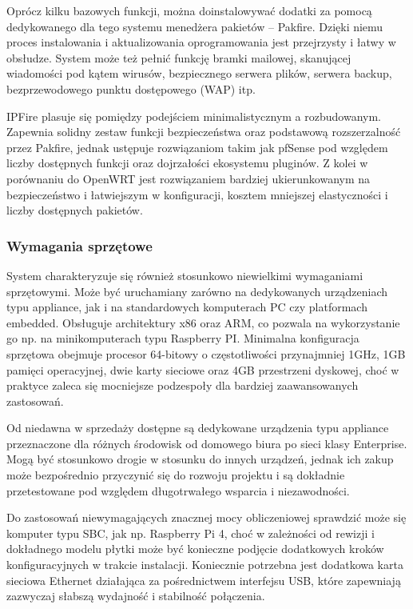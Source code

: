\documentclass[12pt,a4paper]{article}
\begin{document}
Oprócz kilku bazowych funkcji, można doinstalowywać dodatki za pomocą dedykowanego dla tego systemu menedżera pakietów – Pakfire. Dzięki niemu proces instalowania i aktualizowania oprogramowania jest przejrzysty i łatwy w obsłudze. System może też pełnić funkcję bramki mailowej, skanującej wiadomości pod kątem wirusów, bezpiecznego serwera plików, serwera backup, bezprzewodowego punktu dostępowego (WAP) itp.

IPFire plasuje się pomiędzy podejściem minimalistycznym a rozbudowanym. Zapewnia solidny zestaw funkcji bezpieczeństwa oraz podstawową rozszerzalność przez Pakfire, jednak ustępuje rozwiązaniom takim jak pfSense pod względem liczby dostępnych funkcji oraz dojrzałości ekosystemu pluginów. Z kolei w porównaniu do OpenWRT jest rozwiązaniem bardziej ukierunkowanym na bezpieczeństwo i łatwiejszym w konfiguracji, kosztem mniejszej elastyczności i liczby dostępnych pakietów.

\subsubsection{Wymagania sprzętowe}
System charakteryzuje się również stosunkowo niewielkimi wymaganiami sprzętowymi. Może być uruchamiany zarówno na dedykowanych urządzeniach typu appliance, jak i na standardowych komputerach PC czy platformach embedded. Obsługuje architektury x86 oraz ARM, co pozwala na wykorzystanie go np. na minikomputerach typu Raspberry PI. Minimalna konfiguracja sprzętowa obejmuje procesor 64-bitowy o częstotliwości przynajmniej 1GHz, 1GB pamięci operacyjnej, dwie karty sieciowe oraz 4GB przestrzeni dyskowej, choć w praktyce zaleca się mocniejsze podzespoły dla bardziej zaawansowanych zastosowań.

Od niedawna w sprzedaży dostępne są dedykowane urządzenia typu appliance przeznaczone dla różnych środowisk od domowego biura po sieci klasy Enterprise. Mogą być stosunkowo drogie w stosunku do innych urządzeń, jednak ich zakup może bezpośrednio przyczynić się do rozwoju projektu i są dokładnie przetestowane pod względem długotrwałego wsparcia i niezawodności.

Do zastosowań niewymagających znacznej mocy obliczeniowej sprawdzić może się komputer typu SBC, jak np. Raspberry Pi 4, choć w zależności od rewizji i dokładnego modelu płytki może być konieczne podjęcie dodatkowych kroków konfiguracyjnych w trakcie instalacji. Koniecznie potrzebna jest dodatkowa karta sieciowa Ethernet działająca za pośrednictwem interfejsu USB, które zapewniają zazwyczaj słabszą wydajność i stabilność połączenia.
\end{document}
